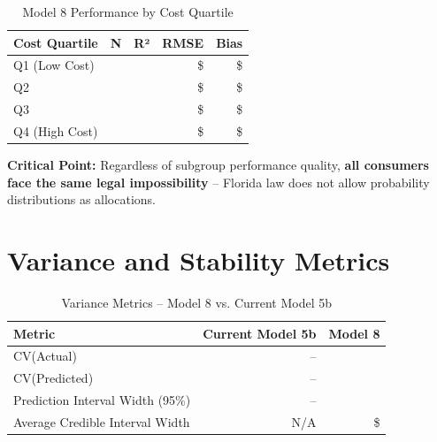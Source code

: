 \begin{table}[h]
\centering
\caption{Model 8 Performance by Cost Quartile}
\begin{tabular}{lrrrr}
\toprule
\textbf{Cost Quartile} & \textbf{N} & \textbf{R²} & \textbf{RMSE} & \textbf{Bias} \\
\midrule
Q1 (Low Cost) & \ModelEightSubgroupcostQOneLowN{} & \ModelEightSubgroupcostQOneLowRSquared{} & \$\ModelEightSubgroupcostQOneLowRMSE{} & \$\ModelEightSubgroupcostQOneLowBias{} \\
Q2 & \ModelEightSubgroupcostQTwoN{} & \ModelEightSubgroupcostQTwoRSquared{} & \$\ModelEightSubgroupcostQTwoRMSE{} & \$\ModelEightSubgroupcostQTwoBias{} \\
Q3 & \ModelEightSubgroupcostQThreeN{} & \ModelEightSubgroupcostQThreeRSquared{} & \$\ModelEightSubgroupcostQThreeRMSE{} & \$\ModelEightSubgroupcostQThreeBias{} \\
Q4 (High Cost) & \ModelEightSubgroupcostQFourHighN{} & \ModelEightSubgroupcostQFourHighRSquared{} & \$\ModelEightSubgroupcostQFourHighRMSE{} & \$\ModelEightSubgroupcostQFourHighBias{} \\
\bottomrule
\end{tabular}
\end{table}

\textbf{Critical Point:} Regardless of subgroup performance quality, \textbf{all consumers face the same legal impossibility} -- Florida law does not allow probability distributions as allocations.


\section{Variance and Stability Metrics}

\begin{table}[h]
\centering
\caption{Variance Metrics -- Model 8 vs. Current Model 5b}
\begin{tabular}{lrr}
\toprule
\textbf{Metric} & \textbf{Current Model 5b} & \textbf{Model 8} \\
\midrule
CV(Actual) & -- & \ModelEightCVActual{} \\
CV(Predicted) & -- & \ModelEightCVPredicted{} \\
Prediction Interval Width (95\%) & -- & \ModelEightPredictionInterval{} \\
Average Credible Interval Width & N/A & \$\ModelEightAvgCredibleWidth{} \\
\bottomrule
\end{tabular}
\end{table}

